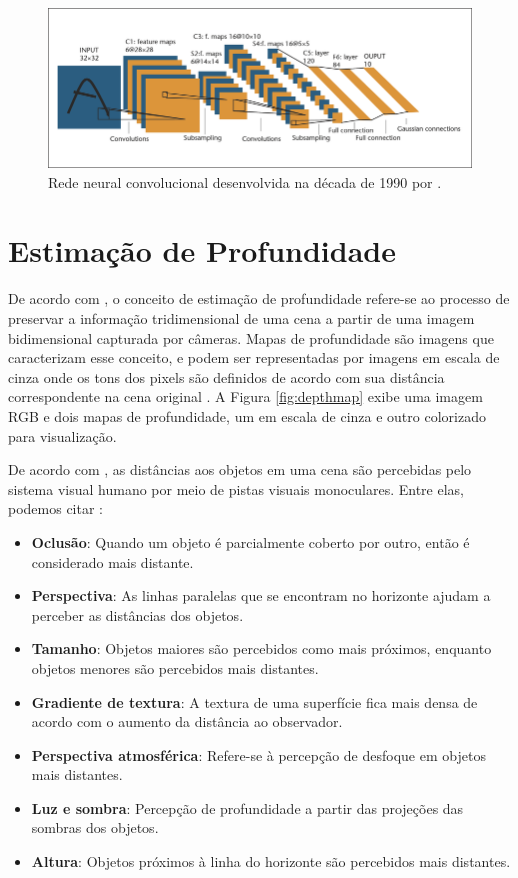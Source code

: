 \begin{figure}
    \centering   
    \includegraphics[width=\textwidth]{fig/A-Convolutional-Neural-Net-LeNet-5-From-Lecun-et-al-1998-C1998-IEEE-reprinted.png}
    \caption{Rede neural convolucional desenvolvida na década de 1990 por .}
    \label{fig:lenet5}
\end{figure}


\section{Estimação de Profundidade}


De acordo com , o conceito de estimação de profundidade refere-se ao processo de preservar a informação tridimensional de uma cena a partir de uma imagem bidimensional capturada por câmeras. Mapas de profundidade são imagens que caracterizam esse conceito, e podem ser representadas por imagens em escala de cinza onde os tons dos pixels são definidos de acordo com sua distância correspondente na cena original \cite{dourado2020multi}. A Figura \ref{fig:depthmap} exibe uma imagem RGB e dois mapas de profundidade, um em escala de cinza e outro colorizado para visualização.


De acordo com , as distâncias aos objetos em uma cena são percebidas pelo sistema visual humano por meio de pistas visuais monoculares. Entre elas, podemos citar :

\begin{itemize}
    \item \textbf{Oclusão}: Quando um objeto é parcialmente coberto por outro, então é considerado mais distante.
    \item \textbf{Perspectiva}: As linhas paralelas que se encontram no horizonte ajudam a perceber as distâncias dos objetos.
    \item \textbf{Tamanho}: Objetos maiores são percebidos como mais próximos, enquanto objetos menores são percebidos mais distantes.
    \item \textbf{Gradiente de textura}: A textura de uma superfície fica mais densa de acordo com o aumento da distância ao observador.
    \item \textbf{Perspectiva atmosférica}: Refere-se à percepção de desfoque em objetos mais distantes.
    \item \textbf{Luz e sombra}: Percepção de profundidade a partir das projeções das sombras dos objetos.
    \item \textbf{Altura}: Objetos próximos à linha do horizonte são percebidos mais distantes.
\end{itemize}

